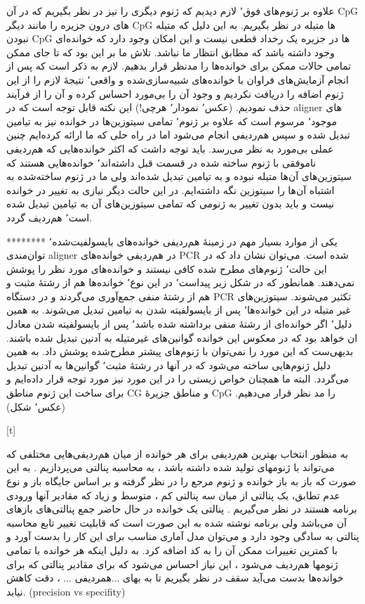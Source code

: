 علاوه بر ژنوم‌های فوق٬ لازم دیدیم که ژنوم دیگری را نیز در نظر بگیریم که در آن CpG های درون جزیره را مانند دیگر CpG ها متیله در نظر بگیریم. به این دلیل که متیله نبودن CpG ها در جزیره یک رخداد قطعی نیست و این امکان وجود دارد که خوانده‌ای وجود داشته باشد که مطابق انتظار ما نباشد. تلاش ما بر این بود که تا جای ممکن تمامی حالات ممکن برای خوانده‌ها را مدنظر قرار بدهیم. لازم به ذکر است که پس از انجام آزمایش‌های فراوان با خوانده‌های شبیه‌سازی‌شده و واقعی٬ نتیجهٔ لازم را از این ژنوم اضافه را دریافت نکردیم و وجود آن را بی‌مورد احساس کرده و آن را از فرآیند حذف نمودیم. (عکس٬ نمودار٬ هرچی!)
 این نکته قابل توجه است که در aligner های موجود٬ مرسوم است که علاوه بر ژنوم٬ تمامی سیتوزین‌ها در خوانده نیز به تیامین تبدیل شده و سپس هم‌ردیفی انجام می‌شود اما در راه حلی که ما ارائه کرده‌ایم چنین عملی بی‌مورد به نظر می‌رسد. باید توجه داشت که اکثر خوانده‌هایی که هم‌ردیفی ناموفقی با ژنوم ساخته شده در قسمت قبل داشته‌اند٬ خوانده‌هایی هستند که سیتوزین‌های آن‌ها متیله نبوده و به تیامین تبدیل شده‌اند ولی ما در ژنوم ساخته‌شده به اشتباه آن‌ها را سیتوزین نگه داشته‌ایم. در این حالت دیگر نیازی به تغییر در خوانده نیست و باید بدون تغییر به ژنومی که تمامی سیتوزین‌های آن به تیامین تبدیل شده است٬ هم‌ردیف گردد.

******** یکی از موارد بسیار مهم در زمینهٔ هم‌ردیفی خوانده‌های بایسولفیت‌شده٬ توان‌مندی aligner در هم‌ردیفی خوانده‌های PCR شده است. می‌توان نشان داد که در این حالت٬ ژنوم‌های مطرح شده کافی نیستند و خوانده‌های مورد نظر را پوشش نمی‌دهند. همانطور که در شکل زیر پیداست٬ در این نوع٬ خوانده‌ها هم از رشتهٔ مثبت و هم از رشتهٔ منفی جمع‌آوری می‌گردند و در دستگاه PCR تکثیر می‌شوند. سیتوزین‌های غیر متیله در این خوانده‌ها٬ پس از بایسولفیته شدن به تیامین تبدیل می‌شوند. به همین دلیل٬ اگر خوانده‌ای از رشتهٔ منفی برداشته شده باشد٬ پس از بایسولفیته شدن معادل ان خواهد بود که در معکوس این خوانده گوانین‌های غیرمتیله به آدنین تبدیل شده باشند. بدیهی‌ست که این مورد را نمی‌توان با ژنوم‌های پیشتر مطرح‌شده پوشش داد. به همین دلیل ژنوم‌هایی ساخته می‌شود که در آنها در رشتهٔ مثبت٬ گوانین‌ها به آدنین تبدیل می‌گردد. البته ما همچنان خواص زیستی را در این مورد نیز مورد توجه قرار داده‌ایم و برای ساخت این ژنوم مناطق CG و مناطق جزیرهٔ CpG را مد نظر قرار می‌دهیم. (عکس٬ شکل)


[t]




به منظور انتخاب بهترین هم‌ردیفی برای هر خوانده از میان هم‌ردیفی‌هایی مختلفی که می‌تواند با ژنومهای تولید شده داشته باشد ، به محاسبه پنالتی می‌پردازیم . به این صورت که باز به باز خوانده و ژنوم مرجع را در نظر گرفته و بر اساس جایگاه باز و نوع عدم تطابق، یک پنالتی از میان سه پنالتی کم ، متوسط و زیاد که مقادیر آنها ورودی برنامه هستند در نظر می‌گیریم . پنالتی یک خوانده در حال حاضر جمع پنالتی‌های بازهای آن می‌باشد ولی برنامه نوشته شده به این صورت است که قابلیت تغییر تابع محاسبه پنالتی به سادگی وجود دارد و می‌توان مدل آماری مناسب برای این کار را بدست آورد و با کمترین تغییرات ممکن آن را به کد اضافه کرد.
به دلیل اینکه هر خوانده با تمامی ژنومها هم‌ردیف می‌شود ، این نیاز احساس می‌شود که برای مقادیر پنالتی که برای خوانده‌ها بدست می‌آید سقف در نظر بگیریم تا به بهای ...همردیفی ... ، دقت کاهش نیابد. (precision vs specifity)

